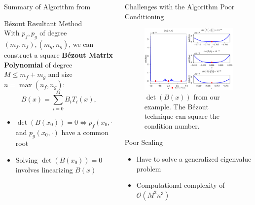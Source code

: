 \documentclass[final]{beamer}
\begin{document}
\begin{frame}{}
\begin{columns}[t]
\begin{column}{.31\linewidth}
\begin{block}{Summary of Algorithm from \cite{nakatsukasa_2013}}
\begin{itemize}
\end{itemize}
{\color{numhypRed} B\'{e}zout Resultant Method}\\
With $p_f,p_g$ of degree $(m_f,n_f),(m_g,n_g)$, we can construct a square {\bf B\'{e}zout Matrix Polynomial} of degree $M\leq m_f+m_g$ and size $n = \max(n_f,n_g)$:
$$B(x) = \sum_{i=0}^{M}B_iT_i(x),$$
\begin{itemize}
\item $\det\left(B(x_0)\right)=0\iff p_f(x_0,\cdot)$ and $p_g(x_0,\cdot)$ have a common root
\item Solving $\det\left(B(x_0)\right)=0$ involves linearizing $B(x)$ 
\end{itemize}
\end{block}



\end{column}

    \begin{column}{.31\linewidth}

%

\begin{block}{Challenges with the Algorithm}
{\color{numhypRed}Poor Conditioning}\\
\begin{center}
\begin{figure}
\includegraphics[width=.6835\textwidth]{bezout_det_plot.pdf}
\caption{$\det(B(x))$ from our example. The B\'{e}zout technique can square the condition number. \cite[Sec.\ 5]{nakatsukasa_2013}
}
\end{figure}
\end{center}
{\color{numhypRed}Poor Scaling}\\
\begin{itemize}
\item Have to solve a generalized eigenvalue problem \cite[Sec.\ 3]{nakatsukasa_2013}
\item Computational complexity of $\mathcal{O}(M^3n^3)$ \cite[Sec.\ 4]{nakatsukasa_2013}
\end{itemize}
\end{block}


\end{column}
\end{columns}
\end{frame}
\end{document}
